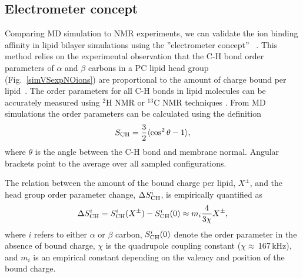 \documentclass[aip,jcp,twocolumn]{revtex4}
\begin{document}
\subsection{Electrometer concept} \label{section:electrometer}
Comparing MD simulation to NMR experiments, we can validate the ion
binding affinity in lipid bilayer simulations using the ''electrometer concept''~ \cite{seelig87, catte16}.
This method relies on the experimental observation that the C-H bond order parameters of $\alpha$ and $\beta$ carbons in a PC lipid head group (Fig.~\ref{simVSexpNOions}) are proportional to the amount of charge bound per lipid~\cite{seelig87}.
The order parameters for all C-H bonds in lipid molecules can be accurately measured using $^2$H NMR or $^{13}$C NMR techniques \cite{ollila16}. From MD simulations the order parameters can be calculated using the definition
\begin{equation}\label{OP}
S_{\rm CH}=\frac{3}{2}\langle \cos^2\theta -1 \rangle,
\end{equation}
where $\theta$ is the angle between the C-H bond and membrane normal. Angular brackets point to the average over all sampled configurations.

The relation between the amount of the bound charge per lipid, $X^\pm$, and the head group order parameter change, $\Delta S_{\rm{CH}}^{i}$, is empirically quantified as~\cite{seelig87,ferreira16}
\begin{equation}\label{OPchangeEQ}
\Delta S_{\rm{CH}}^{i}= S_{\rm{CH}}^{i}(X^\pm)-S_{\rm{CH}}^{i}(0) \approx m_i \frac{4 }{3\chi}X^\pm,
\end{equation}
where $i$ refers to either $\alpha$ or $\beta$ carbon, $S_{\rm{CH}}^{i}(0)$ denote the order parameter in the absence of bound charge, $\chi$ is the quadrupole coupling constant ($\chi \approx$\,167\,kHz), and $m_i$ is an empirical constant depending on the valency and position of the bound charge.
\end{document}
